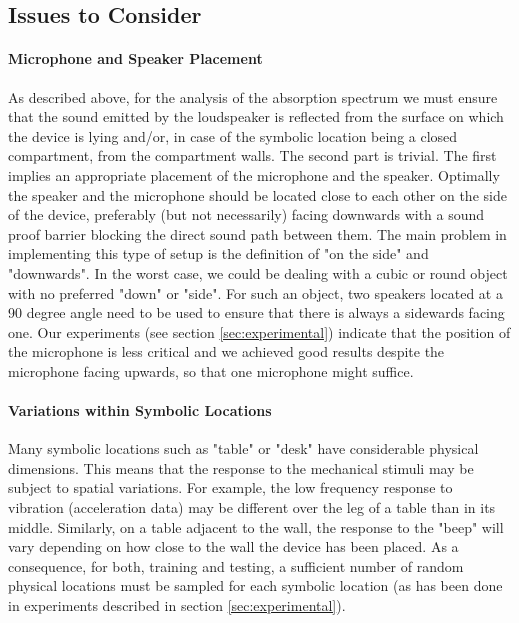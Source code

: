 \subsection{Issues to Consider}
\label{sec:issues}
\paragraph{Microphone and Speaker Placement}
As described above, for the analysis of the absorption spectrum we must
ensure that the sound emitted by the loudspeaker is reflected from the
surface on which the device is lying and/or, in case of the symbolic
location being a closed compartment, from the compartment walls. The
second part is trivial. The first implies an appropriate placement of
the microphone and the speaker. 
Optimally the speaker and the
microphone should be located close to each other
on the side of the device, preferably (but not necessarily) 
facing downwards with a sound proof
barrier blocking the direct sound path between them. The main problem
in implementing this type of setup is the definition of "on the side"
and "downwards". In the worst case, we could be dealing with a cubic
or round object with no preferred "down" or "side". For such an object,
two speakers located at a 90 degree angle 
need to be used to ensure that there is always a sidewards
facing one. Our experiments (see section \ref{sec:experimental})
indicate that the position of the microphone is less critical and we
achieved good results despite the microphone facing upwards, so that
one microphone might suffice. 

 
\paragraph{Variations within Symbolic Locations}
Many symbolic locations such as "table" or "desk" 
have considerable physical dimensions. This means that the response to
the mechanical stimuli may be subject to spatial
variations. For example, the low frequency 
response to vibration (acceleration data) may be different over the
leg of a table than in its middle. Similarly, on a table adjacent to the
wall, the response to the "beep" will vary depending on how close to
the wall the device has been placed.
As a consequence, for both, training and testing, a sufficient number
of random physical locations must be sampled for each symbolic
location (as has been done in experiments described in section \ref{sec:experimental}).

